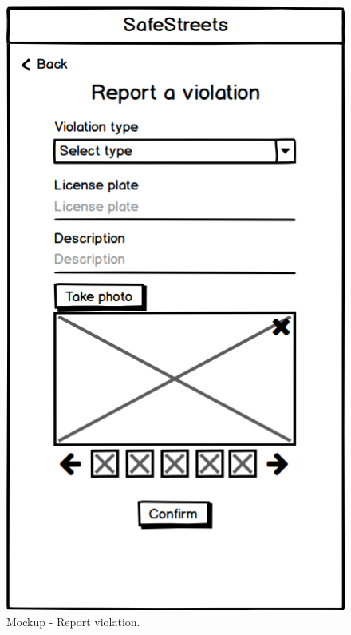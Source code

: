 \begin{figure}[H]
\centering
\begin{minipage}{.4\textwidth}
    \centering
    \includegraphics[width=.8\textwidth]{Images/report-violation.png}
    \caption{\label{fig:mockup-report-violation}Mockup - Report violation.}
\end{minipage}
\begin{minipage}{.4\textwidth}
    \centering

\end{minipage}
\end{figure}
